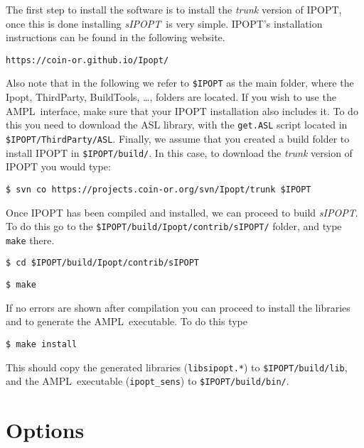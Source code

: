 \documentclass[letter, 11pt]{article}
\newcommand{\sensKKT}{\emph{sIPOPT}}
\newcommand{\AMPL}{AMPL}
\newcommand{\ipoptf}{\$IPOPT}
\newcommand{\sensdir}{sIPOPT}
\newcommand{\sensexe}{ipopt\_sens}
\newcommand{\senslib}{libsipopt}
\begin{document}
The first step to install the software is to install the \emph{trunk} version of IPOPT, once this is done
installing \sensKKT\ is very simple. IPOPT's installation instructions can be
found in the following website.

\begin{description}
\item \texttt{https://coin-or.github.io/Ipopt/}
\end{description}

Also note that in the following we refer to {\tt \ipoptf} as the main folder,
where the Ipopt, ThirdParty, BuildTools, \ldots,
folders are located. If you wish to use the \AMPL\ interface, make sure that your IPOPT
installation also includes it. To
do this you need to download the ASL library, with the {\tt get.ASL}
script located in {\tt \ipoptf/ThirdParty/ASL}. Finally, we assume that you created
a build folder to install IPOPT in  {\tt \ipoptf/build/}. In this case, to download
the \emph{trunk} version of IPOPT you would type:

\begin{description}
  \item  {\tt \$ svn co https://projects.coin-or.org/svn/Ipopt/trunk \ipoptf}
\end{description}

Once IPOPT has been compiled and installed, we can proceed to build \sensKKT. To do this go
to the {\tt \ipoptf/build/Ipopt/contrib/\sensdir/} folder, and type {\tt make} there.

\begin{description}
  \item  {\tt \$ cd \ipoptf/build/Ipopt/contrib/\sensdir}
  \item  {\tt \$ make}
\end{description}

If no errors are shown after compilation you can proceed to install the libraries and
to generate the \AMPL\ executable. To do this type

\begin{description}
  \item  {\tt \$ make install}
\end{description}

This should copy the generated libraries ({\tt \senslib.*}) to {\tt \ipoptf/build/lib}, and the \AMPL\
executable ({\tt \sensexe}) to {\tt \ipoptf/build/bin/}.

\section{Options}
\end{document}
